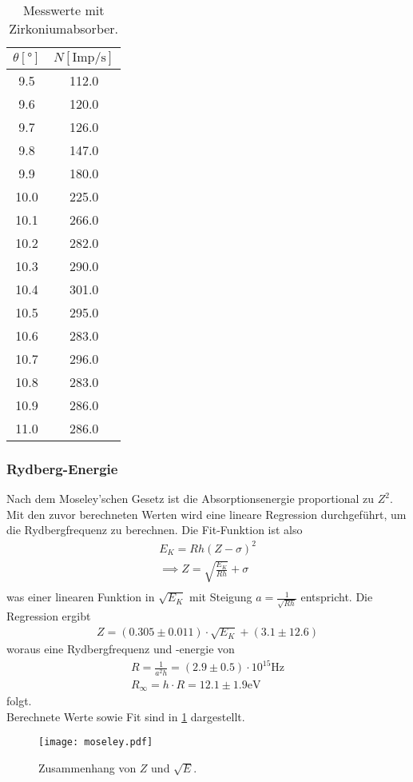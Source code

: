   \begin{table}
    \centering
    \caption{Messwerte mit Zirkoniumabsorber.}
    \label{tab:zirkoniumtab}
    \begin{tabular}{c c}
      \toprule
      $\theta [°]$ & $N [\text{Imp}/\si{\s}]$ \\
      \midrule
      9.5	& 112.0\\
      9.6	& 120.0\\
      9.7	& 126.0\\
      9.8	& 147.0\\
      9.9	& 180.0\\
      10.0	& 225.0\\
      10.1	& 266.0\\
      10.2	& 282.0\\
      10.3	& 290.0\\
      10.4	& 301.0\\
      10.5	& 295.0\\
      10.6	& 283.0\\
      10.7	& 296.0\\
      10.8	& 283.0\\
      10.9	& 286.0\\
      11.0	& 286.0\\
      \bottomrule
    \end{tabular}
  \end{table}
  \FloatBarrier

  \subsubsection{Rydberg-Energie}
    Nach dem Moseley'schen Gesetz ist die Absorptionsenergie proportional zu $Z^2$. Mit den zuvor 
    berechneten Werten wird eine lineare Regression durchgeführt, um die Rydbergfrequenz zu berechnen.
    Die Fit-Funktion ist also 
    \begin{align*}
      E_K = R h (Z - \sigma)^2\\
      \implies Z = \sqrt{\frac{E_K}{R h}} + \sigma\\
    \end{align*}
    was einer linearen Funktion in $\sqrt{E_K}$ mit Steigung $a = \frac{1}{\sqrt{R h}}$ entspricht.
    Die Regression ergibt
    \begin{align*}
      Z = (0.305 \pm 0.011) \cdot \sqrt{E_K} + (3.1 \pm 12.6)
    \end{align*}
    woraus eine Rydbergfrequenz und -energie von
    \begin{align*}
      R = \frac{1}{a^2 h} = (2.9 \pm 0.5) \cdot 10^{15} \si{\Hz}\\
      R_{\infty} = h \cdot R = 12.1 \pm 1.9 \text{eV}
    \end{align*}
    folgt.\\
    Berechnete Werte sowie Fit sind in \ref{fig:moseley} dargestellt.

    \begin{figure}
      \centering
      \texttt{[image: moseley.pdf]}
      \caption{Zusammenhang von $Z$ und $\sqrt{E}$.}
      \label{fig:moseley}
    \end{figure}

    \FloatBarrier